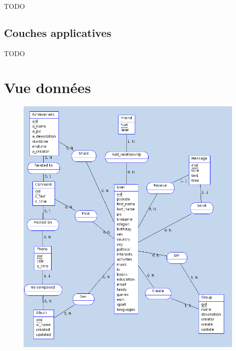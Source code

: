 \documentclass{life-fr}
\begin{document}
TODO

\section{Couches applicatives}

TODO


\chapter{Vue données}

\begin{figure}[H]
  \begin{center}
    \includegraphics[width=17cm]{img/vue_donnees.png}
  \end{center}
\end{figure}
\end{document}

